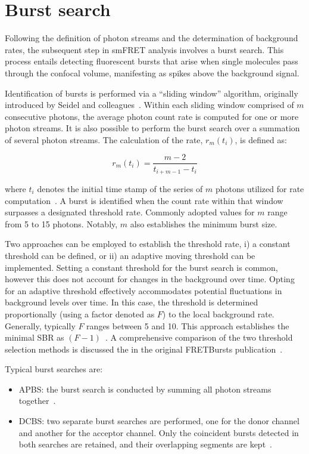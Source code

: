 \section{Burst search}
\label{sec:burst_search_apdx}

Following the definition of photon streams and the determination of background rates, the subsequent step in \ac{smFRET} analysis involves a burst search. 
This process entails detecting fluorescent bursts that arise when single molecules pass through the confocal volume, manifesting as spikes above the background signal.

Identification of bursts is performed via a \enquote{sliding window} algorithm, originally introduced by Seidel and colleagues~\cite{eggeling_PNAS_1998, fries_JPCA_1998}. 
Within each sliding window comprised of $m$ consecutive photons, the average photon count rate is computed for one or more photon streams.
It is also possible to perform the burst search over a summation of several photon streams. 
The calculation of the rate, $r_m(t_i)$, is defined as:

\begin{equation}
\label{eqn:local_rate}
r_m(t_i) = \frac{m-2}{t_{i+m-1}-t_i}
\end{equation}

\noindent
where $t_i$ denotes the initial time stamp of the series of $m$ photons utilized for rate computation~\cite{ingargiola_PLOS1_2016}.
A burst is identified when the count rate within that window surpasses a designated threshold rate.
Commonly adopted values for $m$ range from 5 to 15 photons. 
Notably, $m$ also establishes the minimum burst size.

Two approaches can be employed to establish the threshold rate, i) a constant threshold can be defined, or ii) an adaptive moving threshold can be implemented.
Setting a constant threshold for the burst search is common, however this does not account for changes in the background over time.
Opting for an adaptive threshold effectively accommodates potential fluctuations in background levels over time. 
In this case, the threshold is determined proportionally (using a factor denoted as $F$) to the local background rate. 
Generally, typically $F$ ranges between 5 and 10. 
This approach establishes the minimal \ac{SBR} as $(F - 1)$~\cite{michalet_PRSB_2012}.
A comprehensive comparison of the two threshold selection methods is discussed the in the original FRETBursts publication~\cite{ingargiola_PLOS1_2016}.

Typical burst searches are:
\begin{itemize}
\item \ac{APBS}: the burst search is conducted by summing all photon streams together~\cite{nir_JPCB_2006, eggeling_PNAS_1998, fries_JPCA_1998}.
\item \ac{DCBS}: two separate burst searches are performed, one for the donor channel and another for the acceptor channel. 
Only the coincident bursts detected in both searches are retained, and their overlapping segments are kept~\cite{nir_JPCB_2006}.
\end{itemize}

